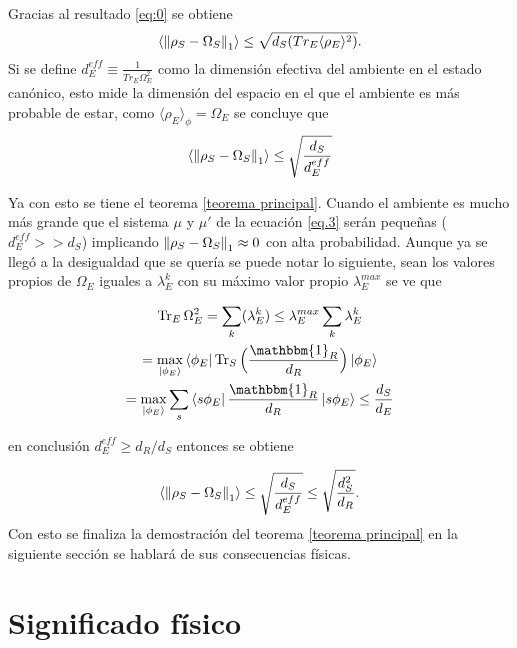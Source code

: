 Gracias al resultado \ref{eq:0} se obtiene
\begin{equation}
\langle \norm{\rho_{S} -\Omega_{S}}_{1} \rangle \le \sqrt{d_{S}(Tr_{E} \langle \rho_{E} \rangle^{2})}.
\end{equation}
Si se define $d_{E}^{eff} \equiv \frac{1}{Tr_{E} \Omega_{E}^{2}}$ como la dimensión efectiva del ambiente en el estado canónico, esto mide la dimensión del espacio en el que el ambiente es más probable de estar, como $\langle \rho_{E} \rangle_{\phi} = \Omega_{E}$ se concluye que 
\begin{equation}
\langle \norm{\rho_{S} -\Omega_{S}}_{1} \rangle \le \sqrt{\frac{d_{S}}{d_{E}^{eff}}}
\end{equation}

Ya con esto se tiene el teorema \ref{teorema principal}. Cuando  el ambiente es mucho más grande que el sistema $\mu$ y $\mu'$  de la ecuación \ref{eq.3} serán pequeñas ($d_{E}^{eff}>>d_{S}$) implicando $\norm{\rho_{S} -\Omega_{S}}_{1} \approx 0$ con alta probabilidad. Aunque ya se llegó a la desigualdad que se quería se puede notar lo siguiente, sean los valores propios de $\Omega_{E}$ iguales a $\lambda_{E}^{k}$ con su máximo valor propio $\lambda_{E}^{max}$ se ve que 

\begin{multline}
\Tr_{E} \Omega_{E}^{2} = \sum_{k} (\lambda_{E}^{k})
\leq \lambda_{E}^{max} \sum_{k} \lambda_{E}^{k}\\
= \max_{\ket{\phi_{E}}} \bra{\phi_{E}} \Tr_{S} \Big( \frac{\mathbbm{1}_{R}}{d_{R}} \Big) \ket{\phi_{E}}\\
= \max_{\ket{\phi_{E}}} \sum_{s} \bra{s \phi_{E}} \frac{\mathbbm{1}_{R}}{d_{R}} \ket{s \phi_{E}} \leq \frac{d_{S}}{d_{E}}	
\end{multline}

en conclusión  $d^{eff}_{E} \geq d_{R}/ d_{S}$ entonces se obtiene

\begin{equation}
\langle \norm{\rho_{S} - \Omega_{S}}_{1} \rangle \leq \sqrt{\frac{d_{S}}{d_{E}^{eff}}} \leq  \sqrt{\frac{d_{S}^{2}}{d_{R}}}.
\end{equation}
Con esto se finaliza la demostración del teorema \ref{teorema principal} en la siguiente sección se hablará de sus consecuencias físicas.

\section{Significado físico}

